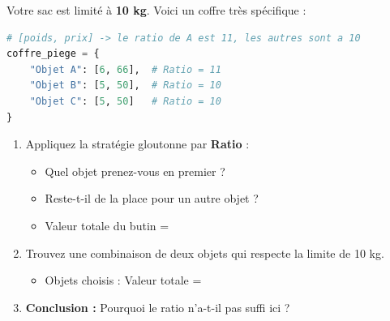 \begin{Exercise}[title={Le Bug du Braqueur : Même le ratio échoue ! }]
Votre sac est limité à \textbf{10 kg}. Voici un coffre très spécifique :
\begin{lstlisting}[style=pythonstyle, language=Python]
# [poids, prix] -> le ratio de A est 11, les autres sont a 10
coffre_piege = {
    "Objet A": [6, 66],  # Ratio = 11
    "Objet B": [5, 50],  # Ratio = 10
    "Objet C": [5, 50]   # Ratio = 10
}
\end{lstlisting}
\begin{enumerate}
    \item  Appliquez la stratégie gloutonne par \textbf{Ratio} :
    \begin{itemize}
        \item Quel objet prenez-vous en premier ? \dotfill
        \item Reste-t-il de la place pour un autre objet ? \dotfill 
        \item Valeur totale du butin = \dotfill
    \end{itemize}
    \item  Trouvez une combinaison de deux objets qui respecte la limite de 10 kg.
    \begin{itemize}
        \item Objets choisis : \dotfill Valeur totale = \dotfill
    \end{itemize}
    \item \textbf{Conclusion :} Pourquoi le ratio n'a-t-il pas suffi ici ? \dotfill
\end{enumerate}
\end{Exercise}

\newpage

